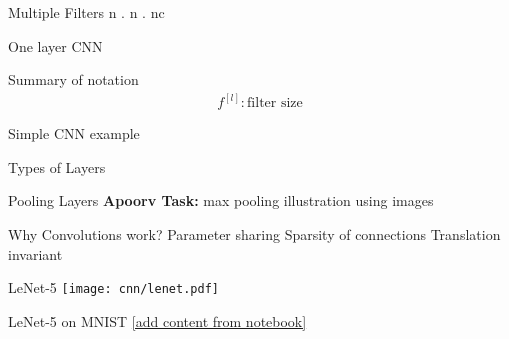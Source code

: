 \documentclass{beamer}
\newcommand{\red}[1]{{\color{red}\small \textbf{Apoorv Task:} #1}}
\begin{document}
\begin{frame}{Multiple Filters}
n . n . nc
\end{frame}

\begin{frame}{One layer CNN}
\end{frame}

\begin{frame}{Summary of notation}
\begin{align}
f^{[l]}: \text{filter size}
\end{align}
\end{frame}

\begin{frame}{Simple CNN example}
\end{frame}

\begin{frame}{Types of Layers}
\end{frame}

\begin{frame}{Pooling Layers}
\red{max pooling illustration using images}
\end{frame}

\begin{frame}{Why Convolutions work?}
Parameter sharing
Sparsity of connections 
Translation invariant
\end{frame}


\begin{frame}{LeNet-5}
\texttt{[image: cnn/lenet.pdf]}
\end{frame}

\begin{frame}{LeNet-5 on MNIST}
\ref{add content from notebook}
\end{frame}
\end{document}
